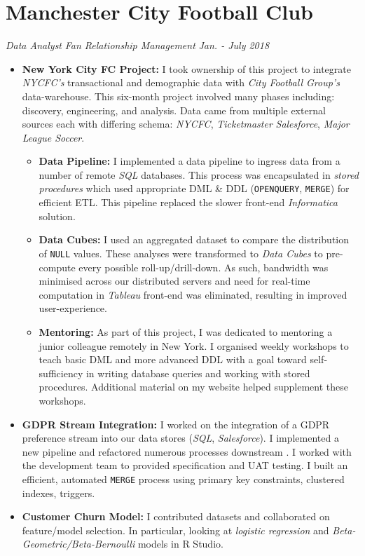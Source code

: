 \documentclass[letterpaper,11pt]{article}
\begin{document}
\section{Manchester City Football Club}
\textit{Data Analyst}
\hfill
\textit{Fan Relationship Management}
\hfill
\textit{Jan. - July 2018}
\begin{itemize}
	\item
	      {
	      \textbf{New York City FC Project:}
	      I took ownership of this project to integrate \textit{NYCFC's} transactional and demographic data with \textit{City Football Group's} data-warehouse. This six-month project involved many phases including: discovery, engineering, and analysis. Data came from multiple external sources each with differing schema: \textit{NYCFC}, \textit{Ticketmaster} \textit{Salesforce}, \textit{Major League Soccer}.
	      \begin{itemize}
		      \item
		            {
		            \textbf{Data Pipeline:}
		            I implemented a data pipeline to ingress data from a number of remote \textit{SQL} databases.
		            This process was encapsulated in \textit{stored procedures} which used appropriate DML \& DDL (\texttt{OPENQUERY}, \texttt{MERGE}) for efficient ETL.
		            This pipeline replaced the slower front-end  \textit{Informatica} solution.
		            }
		      \item
		            {
		            \textbf{Data Cubes:}
		            I used an aggregated dataset to compare the distribution of \texttt{NULL} values. These analyses were transformed to \textit{Data Cubes} to pre-compute every possible roll-up/drill-down. As such, bandwidth was minimised across our distributed servers and need for real-time computation in \textit{Tableau} front-end was eliminated, resulting in improved user-experience.
		            }
		      \item
		            {
		            \textbf{Mentoring:}
		            As part of this project, I was dedicated to mentoring a junior colleague remotely in New York. I organised weekly workshops to teach basic DML and more advanced DDL with a goal toward self-sufficiency in writing database queries and working with stored procedures. Additional material on my website helped supplement these workshops.
		            }
	      \end{itemize}
	      }
	\item
	      {
	      \textbf{GDPR Stream Integration:}
	      I worked on the integration of a GDPR preference stream into our data stores (\textit{SQL}, \textit{Salesforce}). I implemented a new pipeline and refactored numerous processes downstream .
	      I worked with the development team to provided specification and UAT testing. I built an efficient, automated \texttt{MERGE} process using primary key constraints, clustered indexes, triggers.
	      }
	\item
	      {
	      \textbf{Customer Churn Model:}
	      I contributed datasets and collaborated on feature/model selection. In particular, looking at \textit{logistic regression} and \textit{Beta-Geometric/Beta-Bernoulli} models in R Studio.
	      }
\end{itemize}
\end{document}
